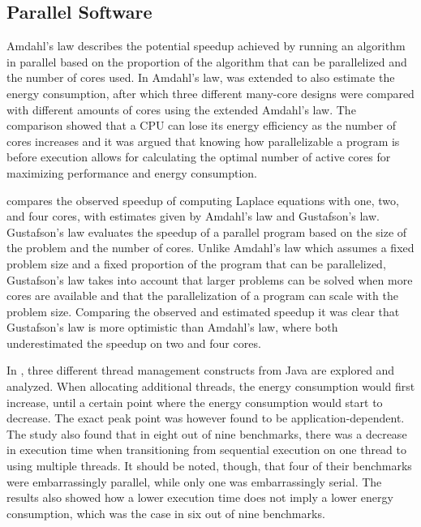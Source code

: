 \subsection{Parallel Software}

Amdahl's law describes the potential speedup achieved by running an algorithm in parallel based on the proportion of the algorithm that can be parallelized and the number of cores used.\cite{amdahl1967validity} In \cite{woo2008extending} Amdahl's law, was extended to also estimate the energy consumption, after which three different many-core designs were compared with different amounts of cores using the extended Amdahl's law. The comparison showed that a CPU can lose its energy efficiency as the number of cores increases and it was argued that knowing how parallelizable a program is before execution allows for calculating the optimal number of active cores for maximizing performance and energy consumption.\cite{woo2008extending}

\cite{prinslow2011overview} compares the observed speedup of computing Laplace equations with one, two, and four cores, with estimates given by Amdahl's law and Gustafson's law. Gustafson's law evaluates the speedup of a parallel program based on the size of the problem and the number of cores. Unlike Amdahl's law which assumes a fixed problem size and a fixed proportion of the program that can be parallelized, Gustafson's law takes into account that larger problems can be solved when more cores are available and that the parallelization of a program can scale with the problem size. Comparing the observed and estimated speedup it was clear that Gustafson's law is more optimistic than Amdahl's law, where both underestimated the speedup on two and four cores.\cite{prinslow2011overview}


In \cite{Pinto2014}, three different thread management constructs from Java are explored and analyzed. When allocating additional threads, the energy consumption would first increase, until a certain point where the energy consumption would start to decrease. The exact peak point was however found to be application-dependent. The study also found that in eight out of nine benchmarks, there was a decrease in execution time when transitioning from sequential execution on one thread to using multiple threads. It should be noted, though, that four of their benchmarks were embarrassingly parallel, while only one was embarrassingly serial. The results also showed how a lower execution time does not imply a lower energy consumption, which was the case in six out of nine benchmarks.\cite{Pinto2014}

